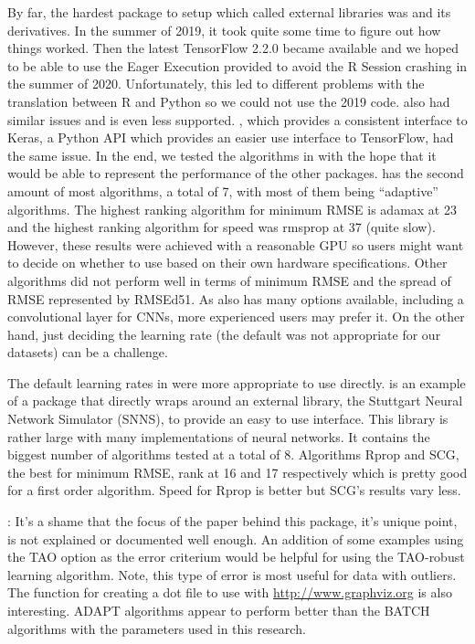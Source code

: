 By far, the hardest package to setup which called external libraries was
 \citep{R-tensorflow} and its derivatives. In the
summer of 2019, it took quite some time to figure out how things worked.
Then the latest TensorFlow 2.2.0 became available and we hoped to be
able to use the Eager Execution provided to avoid the R Session crashing
in the summer of 2020. Unfortunately, this led to different problems
with the translation between R and Python so we could not use the 2019
code.  \citep{R-tfestimators} also had similar
issues and is even less supported.  \citep{R-kerasR},
which provides a consistent interface to Keras, a Python API which
provides an easier use interface to TensorFlow, had the same issue. In
the end, we tested the algorithms in  \citep{R-keras}
with the hope that it would be able to represent the performance of the
other packages.  has the second amount of most
algorithms, a total of 7, with most of them being ``adaptive''
algorithms. The highest ranking algorithm for minimum RMSE is adamax at
23 and the highest ranking algorithm for speed was rmsprop at 37 (quite
slow). However, these results were achieved with a reasonable GPU so
users might want to decide on whether to use  based on
their own hardware specifications. Other algorithms did not perform well
in terms of minimum RMSE and the spread of RMSE represented by RMSEd51.
As  also has many options available, including a
convolutional layer for CNNs, more experienced users may prefer it. On
the other hand, just deciding the learning rate (the default was not
appropriate for our datasets) can be a challenge.

The default learning rates in  \citep{R-RSNNS} were more
appropriate to use directly.  is an example of a package
that directly wraps around an external library, the Stuttgart Neural
Network Simulator (SNNS), to provide an easy to use interface. This
library is rather large with many implementations of neural networks. It
contains the biggest number of algorithms tested at a total of 8.
Algorithms Rprop and SCG, the best for minimum RMSE, rank at 16 and 17
respectively which is pretty good for a first order algorithm. Speed for
Rprop is better but SCG's results vary less.

 \citep{R-AMORE}: It's a shame that the focus of the
paper behind this package, it's unique point, is not explained or
documented well enough. An addition of some examples using the TAO
option as the error criterium would be helpful for using the TAO-robust
learning algorithm. Note, this type of error is most useful for data
with outliers. The function for creating a dot file to use with
\url{http://www.graphviz.org} is also interesting. ADAPT algorithms
appear to perform better than the BATCH algorithms with the parameters
used in this research.

